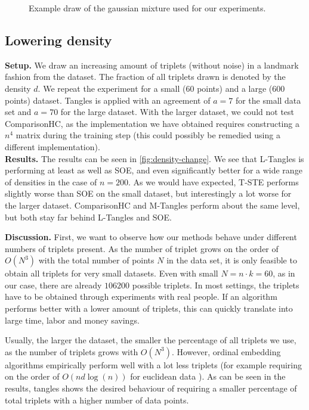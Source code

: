 \begin{figure}[ht]
    \centering
    \resizebox{0.8\textwidth}{!}{}
    \caption{Example draw of the gaussian mixture used for our experiments.}
    \label{fig:dataset-gauss}
\end{figure}

\subsection{Lowering density}\label{sec:lower-density}

\textbf{Setup.} We draw an increasing amount of triplets (without noise) in a landmark fashion from the dataset. 
The fraction of all triplets drawn is denoted by the density $d$.  We repeat the experiment for a small ($60$ points) and a large ($600$ points) dataset.
Tangles is applied with an agreement of $a=7$ for the small data set and $a=70$ for the large dataset.
With the larger dataset, we could not test ComparisonHC, as the implementation we have obtained requires 
constructing a $n^4$ matrix during the training step (this could possibly be remedied using a different implementation). \\

\noindent
\textbf{Results.} The results can be seen in \autoref{fig:density-change}.
We see that L-Tangles is performing at least as well as SOE, and even significantly better for a wide range of densities in the case of $n=200$. 
As we would have expected, T-STE performs slightly worse than SOE on the small dataset, but interestingly a lot worse for the larger dataset. ComparisonHC and M-Tangles
perform about the same level, but both stay far behind L-Tangles and SOE. 

\noindent
\textbf{Discussion.}
First, we want to observe how our methods behave under different numbers of triplets present. 
As the number of triplet grows on the order of $O(N^3)$ with the total number of points $N$ in the data set, it is only feasible to obtain
all triplets for very small datasets. Even with small $N = n \cdot k = 60$, as in our case, there are already $106200$ possible triplets. In most settings, the triplets have to be obtained 
through experiments with real people. If an algorithm performs better with a lower amount
of triplets, this can quickly translate into large time, labor and money savings. 

Usually, the larger the dataset, the smaller the percentage of all triplets we use, as the number of triplets grows with $O(N^3)$. 
However, ordinal embedding algorithms empirically perform well with a lot
less triplets (for example requiring on the order of $O(n d \log(n))$ for euclidean data \citep{jainFiniteSamplePrediction2016}). 
As can be seen in the results, tangles shows the desired behaviour of requiring a smaller percentage of total triplets with a higher number of data points.

